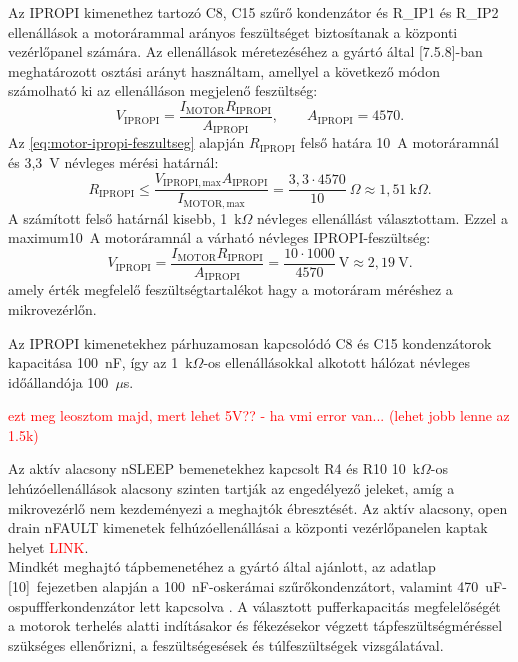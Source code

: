 Az IPROPI kimenethez tartozó C8, C15 szűrő kondenzátor és R\_IP1 és R\_IP2 ellenállások 
a motorárammal arányos feszültséget biztosítanak a központi vezérlőpanel számára.
Az ellenállások méretezéséhez a gyártó által [7.5.8]-ban meghatározott osztási arányt használtam,
amellyel a következő módon számolható ki az ellenálláson megjelenő feszültség:
\begin{equation}
    V_{\mathrm{IPROPI}}=\frac{I_{\mathrm{MOTOR}}R_{\mathrm{IPROPI}}}{A_{\mathrm{IPROPI}}},
    \qquad A_{\mathrm{IPROPI}}=4570.
    \label{eq:motor-ipropi-feszultseg}
\end{equation}
Az \eqref{eq:motor-ipropi-feszultseg} alapján $R_{\mathrm{IPROPI}}$ felső határa 10~A motoráramnál és 3,3~V névleges mérési határnál:
\begin{equation}
    R_{\mathrm{IPROPI}}\leq\frac{V_{\mathrm{IPROPI,max}}A_{\mathrm{IPROPI}}}{I_{\mathrm{MOTOR,max}}}
    =\frac{3{,}3\cdot4570}{10}~\Omega
    \approx1{,}51~\mathrm{k}\Omega.
    \label{eq:motor-ipropi-ellenallas}
\end{equation}
A számított felső határnál kisebb, 1~k$\Omega$ névleges ellenállást 
választottam. Ezzel a maximum10~A motoráramnál a várható névleges IPROPI-feszültség:
\begin{equation}
    V_{\mathrm{IPROPI}}=\frac{I_{\mathrm{MOTOR}}R_{\mathrm{IPROPI}}}{A_{\mathrm{IPROPI}}}
    =\frac{10\cdot1000}{4570}~\mathrm{V}
    \approx2{,}19~\mathrm{V}.
    \label{eq:motor-ipropi-ertek}
\end{equation}
amely érték megfelelő feszültségtartalékot hagy a motoráram méréshez a mikrovezérlőn. 

Az IPROPI kimenetekhez párhuzamosan kapcsolódó C8 és C15 kondenzátorok kapacitása 100~nF, így az
1~k$\Omega$-os ellenállásokkal alkotott hálózat névleges időállandója 100~$\mu$s.

\textcolor{red}{ezt meg leosztom majd, mert lehet 5V?? - ha vmi error van... (lehet jobb lenne az 1.5k)}

Az aktív alacsony nSLEEP bemenetekhez kapcsolt R4 és R10 10~k$\Omega$-os lehúzóellenállások alacsony
szinten tartják az engedélyező jeleket, amíg a mikrovezérlő nem kezdeményezi
a meghajtók ébresztését.
Az aktív alacsony, open drain nFAULT kimenetek felhúzóellenállásai a központi
vezérlőpanelen kaptak helyet \textcolor{red}{LINK}. \\

Mindkét meghajtó tápbemenetéhez a gyártó által ajánlott, az adatlap
[10]~fejezetben alapján a 100~nF-oskerámai szűrőkondenzátort, valamint 470~uF-ospuffferkondenzátor lett kapcsolva 
\cite{drv8244}. A választott pufferkapacitás megfelelőségét a motorok terhelés alatti 
indításakor és fékezésekor végzett tápfeszültségméréssel
szükséges ellenőrizni, a feszültségesések és túlfeszültségek vizsgálatával.

